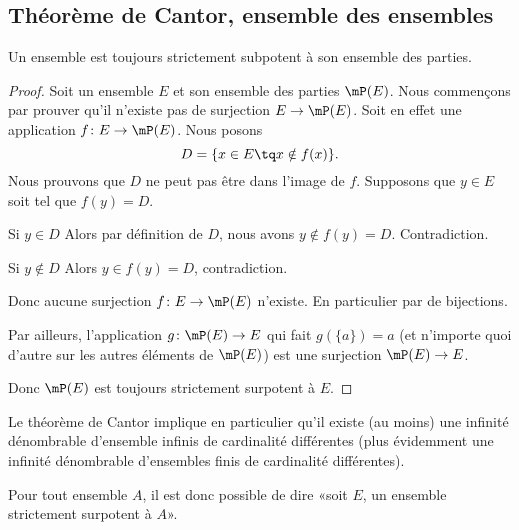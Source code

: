 \subsection{Théorème de Cantor, ensemble des ensembles}

\begin{theorem}     \label{THOooJPNFooWSxUhd}
    Un ensemble est toujours strictement subpotent à son ensemble des parties.
\end{theorem}

\begin{proof}
    Soit un ensemble \( E\) et son ensemble des parties \( \mP(E)\). Nous commençons par prouver qu'il n'existe pas de surjection \( E\to \mP(E)\). Soit en effet une application \( f\colon E\to \mP(E)\). Nous posons
    \begin{equation}
        D=\{ x\in E\tq x\notin f(x) \}.
    \end{equation}
    Nous prouvons que \( D\) ne peut pas être dans l'image de \( f\). Supposons que \( y\in E\) soit tel que \( f(y)=D\).
    \begin{subproof}
        \item[Si \( y\in D\)]
            Alors par définition de \( D\), nous avons \( y\notin f(y)=D\). Contradiction.
        \item[Si \( y\notin D\)]
            Alors \( y\in f(y)=D\), contradiction.
    \end{subproof}
    Donc aucune surjection \( f\colon E\to \mP(E)\) n'existe. En particulier par de bijections.

    Par ailleurs, l'application \( g\colon \mP(E)\to E\) qui fait \( g(\{ a \})=a\) (et n'importe quoi d'autre sur les autres éléments de \( \mP(E)\)) est une surjection \( \mP(E)\to E\).

    Donc \( \mP(E)\) est toujours strictement surpotent à \( E\).
\end{proof}

\begin{normaltext}
    Le théorème de Cantor implique en particulier qu'il existe (au moins) une infinité dénombrable d'ensemble infinis de cardinalité différentes (plus évidemment une infinité dénombrable d'ensembles finis de cardinalité différentes).

    Pour tout ensemble \( A\), il est donc possible de dire «soit \( E\), un ensemble strictement surpotent à \( A\)».
\end{normaltext}

